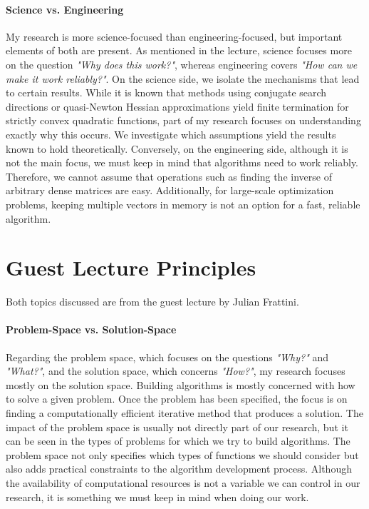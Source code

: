 \documentclass[12pt]{article}
\begin{document}
\paragraph{Science vs. Engineering} My research is more science-focused than engineering-focused, but important elements of both are present. As mentioned in the lecture, science focuses more on the question \textit{"Why does this work?"}, whereas engineering covers \textit{"How can we make it work reliably?"}.
On the science side, we isolate the mechanisms that lead to certain results. While it is known that methods using conjugate search directions or quasi-Newton Hessian approximations yield finite termination for strictly convex quadratic functions, part of my research focuses on understanding exactly why this occurs. We investigate which assumptions yield the results known to hold theoretically.
Conversely, on the engineering side, although it is not the main focus, we must keep in mind that algorithms need to work reliably. Therefore, we cannot assume that operations such as finding the inverse of arbitrary dense matrices are easy. Additionally, for large-scale optimization problems, keeping multiple vectors in memory is not an option for a fast, reliable algorithm.
\section{Guest Lecture Principles}
Both topics discussed are from the guest lecture by Julian Frattini.
\paragraph{Problem-Space vs. Solution-Space} Regarding the problem space, which focuses on the questions \textit{"Why?"} and \textit{"What?"}, and the solution space, which concerns \textit{"How?"}, my research focuses mostly on the solution space.
Building algorithms is mostly concerned with how to solve a given problem. Once the problem has been specified, the focus is on finding a computationally efficient iterative method that produces a solution.
The impact of the problem space is usually not directly part of our research, but it can be seen in the types of problems for which we try to build algorithms. The problem space not only specifies which types of functions we should consider but also adds practical constraints to the algorithm development process. Although the availability of computational resources is not a variable we can control in our research, it is something we must keep in mind when doing our work.
\end{document}
